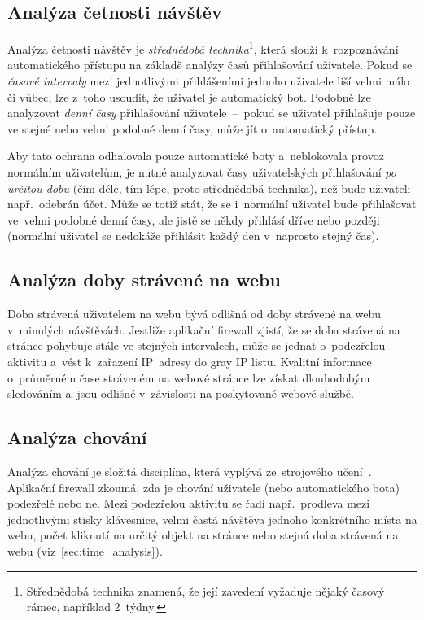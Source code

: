 \subsection*{Analýza četnosti návštěv}
Analýza četnosti návštěv je \textit{střednědobá technika}\footnote{Střednědobá technika znamená, že její zavedení vyžaduje nějaký časový rámec, například 2~týdny.}, která slouží k~rozpoznávání automatického přístupu na základě analýzy časů přihlašování uživatele. Pokud se \textit{časové intervaly} mezi jednotlivými přihlášeními jednoho uživatele liší velmi málo či vůbec, lze z~toho usoudit, že uživatel je automatický bot. Podobně lze analyzovat \textit{denní časy} přihlašování uživatele~--~pokud se uživatel přihlašuje pouze ve stejné nebo velmi podobné denní časy, může jít o~automatický přístup.

Aby tato ochrana odhalovala pouze automatické boty a~neblokovala provoz normálním uživatelům, je nutné analyzovat časy uživatelských přihlašování \textit{po určitou dobu} (čím déle, tím lépe, proto střednědobá technika), než bude uživateli např.~odebrán účet. Může se totiž stát, že se i~normální uživatel bude přihlašovat ve~velmi podobné denní časy, ale jistě se někdy přihlásí dříve nebo později (normální uživatel se nedokáže přihlásit každý den v~naprosto stejný čas). 

\subsection*{Analýza doby strávené na webu}
\label{sec:time_analysis}
Doba strávená uživatelem na webu bývá odlišná od doby strávené na webu v~minulých návštěvách. Jestliže aplikační firewall zjistí, že se doba strávená na stránce pohybuje stále ve stejných intervalech, může se jednat o~podezřelou aktivitu a~vést k~zařazení IP~adresy do gray IP listu. Kvalitní informace o~průměrném čase stráveném na webové stránce lze získat dlouhodobým sledováním a~jsou odlišné v~závislosti na poskytované webové službě.

\subsection*{Analýza chování}
Analýza chování je složitá disciplína, která vyplývá ze~strojového učení~\cite{bib:behaviorAnalysis}. Aplikační firewall zkoumá, zda je chování uživatele (nebo automatického bota) podezřelé nebo ne. Mezi podezřelou aktivitu se řadí např.~prodleva mezi jednotlivými stisky klávesnice, velmi častá návštěva jednoho konkrétního místa na webu, počet kliknutí na určitý objekt na stránce nebo stejná doba strávená na webu (viz~\ref{sec:time_analysis}). 

